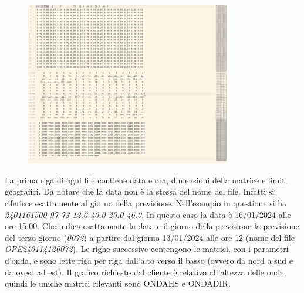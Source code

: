 \documentclass[./main.tex]{subfiles}
\begin{document}
\begin{figure}[!ht]
\noindent \begin{minipage}{\textwidth}
\vspace{1cm}
\centering
\includegraphics[width=0.8\textwidth]{images/OPE_henetus_example_2401161500.pdf}
\captionsetup{font=small, hypcap=false}
\label{fig:OPE_henetus_example_2401161500}
\end{minipage}
\vspace{0.25cm}
\end{figure}

La prima riga di ogni file contiene data e ora, dimensioni della matrice e limiti geografici. Da notare che la data non è la stessa del nome del file. Infatti si riferisce esattamente al giorno della previsione. Nell'esempio in questione si ha \textit{2401161500        97        73  12.0  40.0  20.0  46.0}. In questo caso la data è 16/01/2024 alle ore 15:00. Che indica esattamente la data e il giorno della previsione la previsione del terzo giorno (\textit{0072}) a partire dal giorno 13/01/2024 alle ore 12 (nome del file \textit{OPE240114120072}). Le righe successive contengono le matrici, con i parametri d'onda, e sono lette riga per riga dall'alto verso il basso (ovvero da nord a sud e da ovest ad est). Il grafico richiesto dal cliente è relativo all'altezza delle onde, quindi le uniche matrici rilevanti sono ONDAHS e ONDADIR.\par
\end{document}
